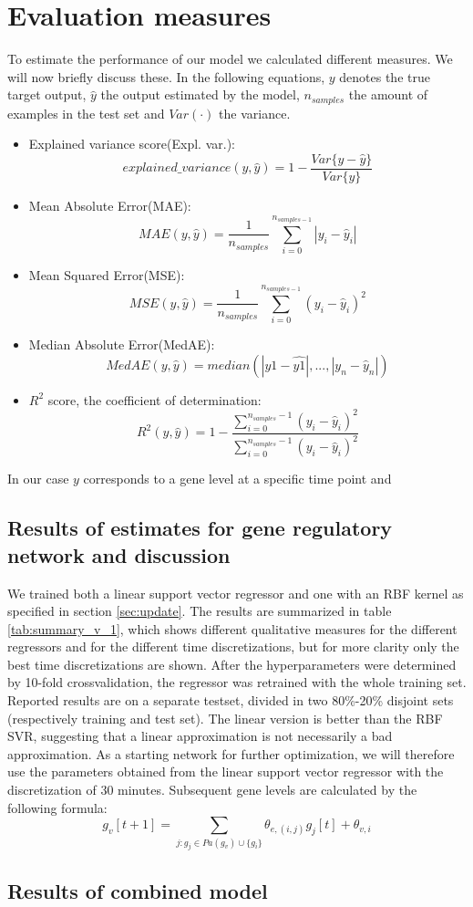 \section{Evaluation measures}
To estimate the performance of our model we calculated different measures. We will now briefly discuss these.
In the following equations, $y$ denotes the true target output, $\hat{y}$ the output estimated by the model, $n_{samples}$
the amount of examples in the test set and $Var(\cdot)$ the variance.
\begin{itemize}
 \item Explained variance score(Expl. var.): 
 $$explained\_variance(y,\hat{y}) = 1 - \frac{Var\{y - \hat{y}\}}{Var\{y\}}$$
 \item Mean Absolute Error(MAE): 
 $$MAE(y,\hat{y}) = \frac{1}{n_{samples}} \sum_{i=0}^{n_{samples-1}} |y_i - \hat{y}_i|$$
\item Mean Squared Error(MSE):
 $$MSE(y,\hat{y}) = \frac{1}{n_{samples}} \sum_{i=0}^{n_{samples-1}} (y_i - \hat{y}_i)^2$$
 \item Median Absolute Error(MedAE):
 $$MedAE(y,\hat{y}) = median( |y1-\hat{y1}|, ..., |y_n - \hat{y}_n|) $$
 \item $R^2$ score, the coefficient of determination:
 $$R^2(y,\hat{y}) = 1 - \frac{\sum_{i=0}^{n_{samples} - 1 } (y_i - \hat{y}_i)^2}{\sum_{i=0}^{n_{samples}-1}(y_i - \hat{y}_i)^2}$$
\end{itemize}
In our case $y$ corresponds to a gene level at a specific time point and 
\subsection{Results of estimates for gene regulatory network and discussion}
We trained both a linear support vector regressor and one with an RBF kernel as specified in section \ref{sec:update}.
The results are summarized in table \ref{tab:summary_v_1}, which shows different qualitative measures for the different regressors and for the different time discretizations, but for more clarity only the best time discretizations are shown.
After the hyperparameters were determined by 10-fold crossvalidation, the regressor was retrained with the whole training set. Reported results are on a separate testset, divided in two 80\%-20\% disjoint sets (respectively training and test set).
The linear version is better than the RBF SVR, suggesting that a linear approximation is not necessarily a bad approximation. As a starting network for further optimization, we will therefore use the parameters obtained from the linear support vector
regressor with the discretization of 30 minutes. 
Subsequent gene levels are calculated by the following formula:
\begin{equation}\label{eq:gene_update}
 g_v[t+1] = \sum_{j : g_j \in Pa(g_v) \cup \{g_i\} } \theta_{e,(i,j)}g_j[t] + \theta_{v,i}
\end{equation}


\subsection{ Results of combined model }
